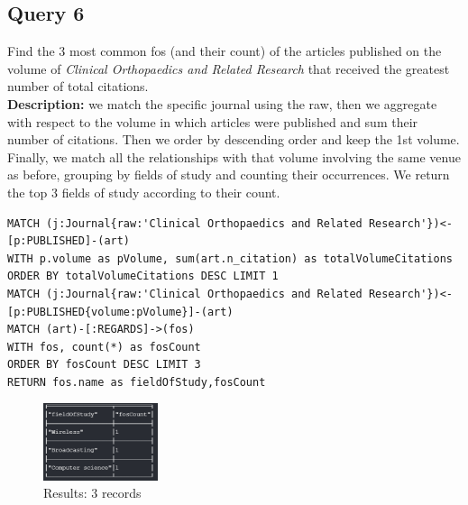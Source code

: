 \documentclass{Configuration_Files/PoliMi3i_thesis}
\begin{document}
\subsection{Query 6}
Find the 3 most common fos (and their count) of the articles published on the volume of \emph{Clinical Orthopaedics and Related Research}
that received the greatest number of total citations.\\
\textbf{Description:} we match the specific journal using the raw, then we aggregate with respect to the volume in which
articles were published and sum their number of citations. Then we order by descending order and keep the 1st volume. Finally,
we match all the relationships with that volume involving the same venue as before, grouping by fields of study and counting
their occurrences. We return the top 3 fields of study according to their count.
\begin{lstlisting}[language=cypher, label=lst:cypher-example]
MATCH (j:Journal{raw:'Clinical Orthopaedics and Related Research'})<-[p:PUBLISHED]-(art)
WITH p.volume as pVolume, sum(art.n_citation) as totalVolumeCitations
ORDER BY totalVolumeCitations DESC LIMIT 1
MATCH (j:Journal{raw:'Clinical Orthopaedics and Related Research'})<-[p:PUBLISHED{volume:pVolume}]-(art)
MATCH (art)-[:REGARDS]->(fos)
WITH fos, count(*) as fosCount
ORDER BY fosCount DESC LIMIT 3
RETURN fos.name as fieldOfStudy,fosCount
\end{lstlisting}
\begin{figure}[H]
\centering
\includegraphics[width=0.3\textwidth]{query/query6.PNG}
\caption{Results: 3 records}
\label{fig:query6}
\end{figure}
\end{document}
